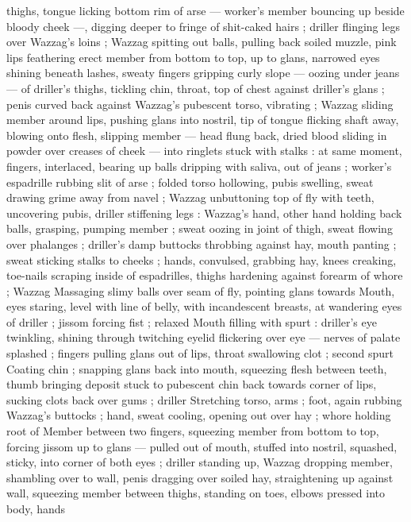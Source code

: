 thighs, tongue licking bottom rim of arse --- worker's member 
bouncing up beside bloody cheek ---, digging deeper to fringe of 
shit-caked hairs ; driller flinging legs over Wazzag's loins ; Wazzag 
spitting out balls, pulling back soiled muzzle, pink lips feathering 
erect member from bottom to top, up to glans, narrowed eyes shining 
beneath lashes, sweaty fingers gripping curly slope --- oozing under 
jeans --- of driller's thighs, tickling chin, throat, top of chest against 
driller's glans ; penis curved back against Wazzag's pubescent torso, 
vibrating ; Wazzag sliding member around lips, pushing glans into 
nostril, tip of tongue flicking shaft away, blowing onto flesh, slipping 
member --- head flung back, dried blood sliding in powder over 
creases of cheek --- into ringlets stuck with stalks : at same moment, 
fingers, interlaced, bearing up balls dripping with saliva, out of jeans 
; worker's espadrille rubbing slit of arse ; folded torso hollowing, 
pubis swelling, sweat drawing grime away from navel ; Wazzag 
unbuttoning top of fly with teeth, uncovering pubis, driller stiffening 
legs : Wazzag's hand, other hand holding back balls, grasping, 
pumping member ; sweat oozing in joint of thigh, sweat flowing over 
phalanges ; driller's damp buttocks throbbing against hay, mouth 
panting ; sweat sticking stalks to cheeks ; hands, convulsed, 
grabbing hay, knees creaking, toe-nails scraping inside of 
espadrilles, thighs hardening against forearm of whore ; Wazzag 
Massaging slimy balls over seam of fly, pointing glans towards 
Mouth, eyes staring, level with line of belly, with incandescent 
breasts, at wandering eyes of driller ; jissom forcing fist ; relaxed 
Mouth filling with spurt : driller's eye twinkling, shining through 
twitching eyelid flickering over eye --- nerves of palate splashed ; 
fingers pulling glans out of lips, throat swallowing clot ; second spurt 
Coating chin ; snapping glans back into mouth, squeezing flesh 
between teeth, thumb bringing deposit stuck to pubescent chin back 
towards corner of lips, sucking clots back over gums ; driller 
Stretching torso, arms ; foot, again rubbing Wazzag's buttocks ; 
hand, sweat cooling, opening out over hay ; whore holding root of 
Member between two fingers, squeezing member from bottom to top, 
forcing jissom up to glans --- pulled out of mouth, stuffed into 
nostril, squashed, sticky, into corner of both eyes ; driller standing 
up, Wazzag dropping member, shambling over to wall, penis dragging 
over soiled hay, straightening up against wall, squeezing member 
between thighs, standing on toes, elbows pressed into body, hands 
